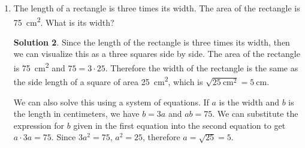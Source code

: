 \documentclass{article}
\theoremstyle{definition}
\newtheorem*{solution}{Solution}
\begin{document}
\begin{enumerate}
\begin{solution}
            Alternatively, we can also use a system of equations. If $a$ is the
            number of two point shots and $b$ is the number of three point
            shots, we have $a + b = 12$ and $2a + 3b = 34$. Multiplying the
            first equation by $-2$ gives $-2a - 2b = -24$, and adding this with
            the second equation gives $2a + 3b - 2a - 2b = 34 - 24$, so $b =
            10$.
        \end{solution}
        \item The length of a rectangle is three times its width. The area of
        the rectangle is \SI{75}{\cm\squared}. What is its width?
        \begin{solution}
            Since the length of the rectangle is three times its width, then we
            can visualize this as a three squares side by side. The area of the
            rectangle is \SI{75}{\cm\squared} and $75 = 3 \cdot 25$. Therefore
            the width of the rectangle is the same as the side length of a
            square of area \SI{25}{\cm\squared}, which is
            $\sqrt{\SI{25}{\cm\squared}} = \SI{5}{\cm}$.

            We can also solve this using a system of equations. If $a$ is the
            width and $b$ is the length in centimeters, we have $b = 3a$ and $ab
            = 75$. We can substitute the expression for $b$ given in the first
            equation into the second equation to get $a \cdot 3a = 75$. Since
            $3a^2 = 75$, $a^2 = 25$, therefore $a = \sqrt{25} = 5$.
        \end{solution}
    \end{enumerate}
\end{document}
